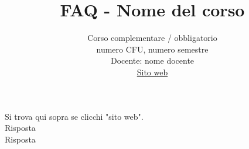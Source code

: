 \documentclass{article}
\title{FAQ - \textbf{Nome del corso}}
\author{
	Corso complementare / obbligatorio\\numero CFU, numero semestre\\
	Docente: nome docente\\ 
	\href{}{Sito web}
	\date{}
}
\begin{document}
 
\maketitle

\begin{enumerate}

\rmfamily
{} 
Si trova qui sopra se clicchi "sito web".\\
	
Risposta \\

Risposta \\
 
\end{enumerate}
\end{document}
